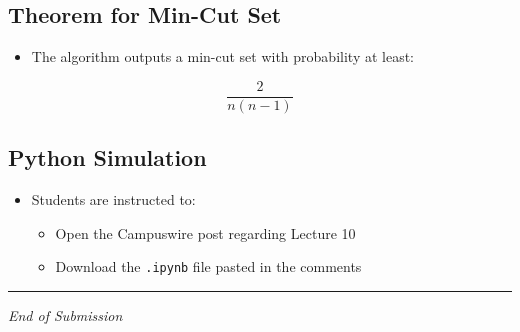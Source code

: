 \documentclass[11pt]{article}
\begin{document}
\subsection{Theorem for Min-Cut Set}

\begin{itemize}
    \item The algorithm outputs a min-cut set with probability at least:
\end{itemize}

\[
\frac{2}{n(n - 1)}
\]

\subsection{Python Simulation}

\begin{itemize}
    \item Students are instructed to:
    \begin{itemize}
        \item Open the Campuswire post regarding Lecture 10
        \item Download the \texttt{.ipynb} file pasted in the comments
    \end{itemize}
\end{itemize}

\bigskip
\hrule
\vspace{0.2cm}
\begin{center}
    \small \textit{End of Submission}
\end{center}
\end{document}
